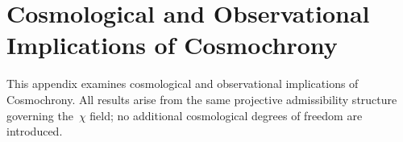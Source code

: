\clearpage

\section{Cosmological and Observational Implications of Cosmochrony}
  \label{sec:appendix-cosmo}

  This appendix examines cosmological and observational implications of
  Cosmochrony.
  All results arise from the same projective admissibility structure governing
  the~$\chi$ field; no additional cosmological degrees of freedom are
  introduced.

  
  
  
  
  
  
  
  
  
  
